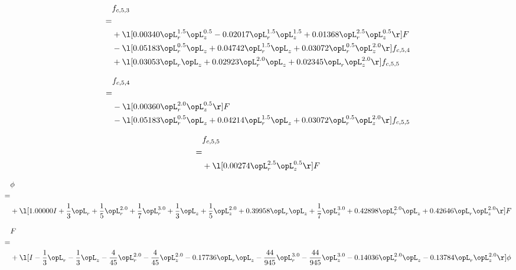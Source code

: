 \begin{alignat}{2} 
\label{eq:f_53_2} 
& f_{c,5,3} \nonumber \\ 
 = \\ 
& + \l[  0.00340 \opL_r^{1.5} \opL_z^{0.5}   -0.02017 \opL_r^{1.5} \opL_z^{1.5} +  0.01368 \opL_r^{2.5} \opL_z^{0.5}  \r] F \nonumber \\ 
& - \l[  0.05183 \opL_r^{0.5} \opL_z +  0.04742 \opL_r^{1.5} \opL_z +  0.03072 \opL_r^{0.5} \opL_z^{2.0}  \r] f_{c,5,4} \nonumber \\ 
& + \l[  0.03053 \opL_r \opL_z +  0.02923 \opL_r^{2.0} \opL_z +  0.02345 \opL_r \opL_z^{2.0}  \r] f_{c,5,5} \nonumber \\ 
\end{alignat} 


\begin{alignat}{2} 
\label{eq:f_54_2} 
& f_{c,5,4} \nonumber \\ 
 = \\ 
& - \l[  0.00360 \opL_r^{2.0} \opL_z^{0.5}  \r] F \nonumber \\ 
& - \l[  0.05183 \opL_r^{0.5} \opL_z +  0.04214 \opL_r^{1.5} \opL_z +  0.03072 \opL_r^{0.5} \opL_z^{2.0}  \r] f_{c,5,5} \nonumber \\ 
\end{alignat} 


\begin{alignat}{2} 
\label{eq:f_55_2} 
& f_{c,5,5} \nonumber \\ 
 = \\ 
& + \l[  0.00274 \opL_r^{2.5} \opL_z^{0.5}  \r] F \nonumber \\ 
\end{alignat} 


\begin{alignat}{2} 
\label{eq:scalarFlux_1} 
& \phi \nonumber \\ 
 = \\ 
& + \l[  1.00000 I + \frac{1}{3} \opL_r + \frac{1}{5} \opL_r^{2.0} + \frac{1}{7} \opL_r^{3.0} + \frac{1}{3} \opL_z + \frac{1}{5} \opL_z^{2.0} +  0.39958 \opL_r \opL_z + \frac{1}{7} \opL_z^{3.0} +  0.42898 \opL_r^{2.0} \opL_z +  0.42646 \opL_r \opL_z^{2.0}  \r] F \nonumber \\ 
\end{alignat} 


\begin{alignat}{2} 
\label{eq:transport3D_0} 
& F \nonumber \\ 
 = \\ 
& + \l[ I - \frac{1}{3} \opL_r - \frac{1}{3} \opL_z - \frac{4}{45} \opL_r^{2.0} - \frac{4}{45} \opL_z^{2.0}   -0.17736 \opL_r \opL_z - \frac{44}{945} \opL_r^{3.0} - \frac{44}{945} \opL_z^{3.0}   -0.14036 \opL_r^{2.0} \opL_z   -0.13784 \opL_r \opL_z^{2.0}  \r] \phi \nonumber \\ 
\end{alignat} 



